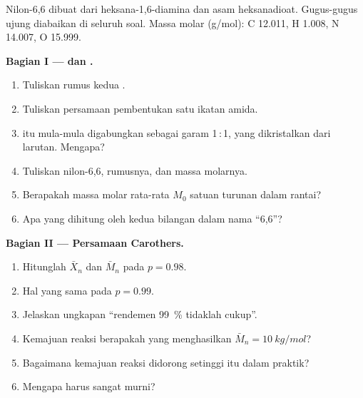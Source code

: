 \begin{problem}
\label{pb:b2:polymer-synthesis:1}
Nilon-6,6 dibuat dari heksana-1,6-diamina dan asam heksanadioat. Gugus-gugus
ujung diabaikan di seluruh soal. Massa molar (\unit{g/mol}): C 12.011,
H 1.008, N 14.007, O 15.999.

\medskip
\noindent\textbf{Bagian I ---  dan .}
\begin{enumerate}
  \item Tuliskan rumus kedua .
  \item Tuliskan persamaan pembentukan satu ikatan amida.
  \item {} itu mula-mula digabungkan sebagai garam 1\,:\,1,
        yang dikristalkan dari larutan. Mengapa?
  \item Tuliskan  nilon-6,6, rumusnya, dan massa molarnya.
  \item Berapakah massa molar rata-rata $M_0$ satuan turunan  dalam rantai?
  \item Apa yang dihitung oleh kedua bilangan dalam nama ``6,6''?
\end{enumerate}

\medskip
\noindent\textbf{Bagian II --- Persamaan Carothers.}
\begin{enumerate}[resume]
  \item Hitunglah $\bar X_n$ dan $\bar M_n$ pada $p = 0.98$.
  \item Hal yang sama pada $p = 0.99$.
  \item Jelaskan ungkapan ``rendemen 99~\% tidaklah cukup''.
  \item Kemajuan reaksi berapakah yang menghasilkan $\bar M_n = \qty{10}{kg/mol}$?
  \item Bagaimana kemajuan reaksi didorong setinggi itu dalam praktik?
  \item Mengapa  harus sangat murni?
\end{enumerate}


\end{problem}
